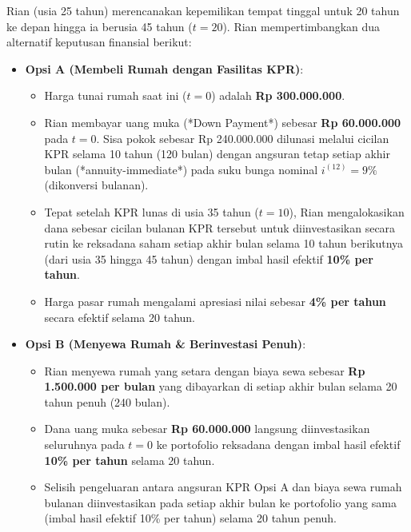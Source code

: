 \documentclass[11pt,a4paper]{article}
\begin{document}
\begin{naskahsoalbox}
Rian (usia 25 tahun) merencanakan kepemilikan tempat tinggal untuk 20 tahun ke depan hingga ia berusia 45 tahun ($t = 20$). Rian mempertimbangkan dua alternatif keputusan finansial berikut:
\begin{itemize}[leftmargin=4mm, topsep=1pt, itemsep=1pt]
    \item \textbf{Opsi A (Membeli Rumah dengan Fasilitas KPR)}:
    \begin{itemize}[leftmargin=4mm]
        \item Harga tunai rumah saat ini ($t=0$) adalah \textbf{Rp 300.000.000}.
        \item Rian membayar uang muka (*Down Payment*) sebesar \textbf{Rp 60.000.000} pada $t=0$. Sisa pokok sebesar Rp 240.000.000 dilunasi melalui cicilan KPR selama 10 tahun (120 bulan) dengan angsuran tetap setiap akhir bulan (*annuity-immediate*) pada suku bunga nominal $i^{(12)} = 9\%$ (dikonversi bulanan).
        \item Tepat setelah KPR lunas di usia 35 tahun ($t=10$), Rian mengalokasikan dana sebesar cicilan bulanan KPR tersebut untuk diinvestasikan secara rutin ke reksadana saham setiap akhir bulan selama 10 tahun berikutnya (dari usia 35 hingga 45 tahun) dengan imbal hasil efektif \textbf{10\% per tahun}.
        \item Harga pasar rumah mengalami apresiasi nilai sebesar \textbf{4\% per tahun} secara efektif selama 20 tahun.
    \end{itemize}
    \item \textbf{Opsi B (Menyewa Rumah \& Berinvestasi Penuh)}:
    \begin{itemize}[leftmargin=4mm]
        \item Rian menyewa rumah yang setara dengan biaya sewa sebesar \textbf{Rp 1.500.000 per bulan} yang dibayarkan di setiap akhir bulan selama 20 tahun penuh (240 bulan).
        \item Dana uang muka sebesar \textbf{Rp 60.000.000} langsung diinvestasikan seluruhnya pada $t=0$ ke portofolio reksadana dengan imbal hasil efektif \textbf{10\% per tahun} selama 20 tahun.
        \item Selisih pengeluaran antara angsuran KPR Opsi A dan biaya sewa rumah bulanan diinvestasikan pada setiap akhir bulan ke portofolio yang sama (imbal hasil efektif 10\% per tahun) selama 20 tahun penuh.
    \end{itemize}

\end{itemize}
\end{naskahsoalbox}
\end{document}
